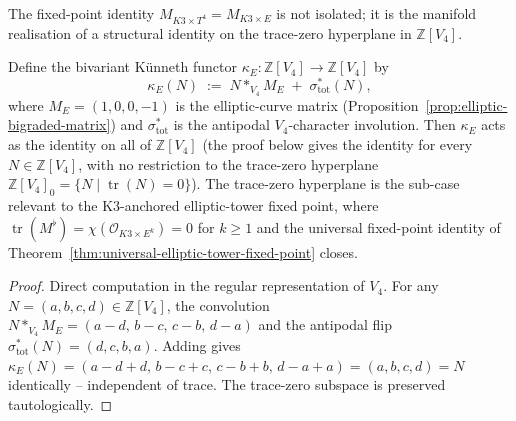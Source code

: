 The fixed-point identity $M_{K3 \times T^4} = M_{K3 \times E}$ is not
isolated; it is the manifold realisation of a structural identity on
the trace-zero hyperplane in $\mathbb{Z}[V_4]$.

\begin{lemma}
\label{lem:bivariant-kunneth-identity}
Define the bivariant Künneth functor
$\kappa_E: \mathbb{Z}[V_4] \to \mathbb{Z}[V_4]$ by
\[
 \kappa_E(N) \;:=\; N *_{V_4} M_E \;+\; \sigma_{\mathrm{tot}}^*(N),
\]
where $M_E = (1, 0, 0, -1)$ is the elliptic-curve matrix
\textup{(}Proposition~\ref{prop:elliptic-bigraded-matrix}\textup{)}
and $\sigma_{\mathrm{tot}}^*$ is the antipodal $V_4$-character involution.
Then $\kappa_E$ acts as the identity on all of $\mathbb{Z}[V_4]$
\textup{(}the proof below gives the identity for every $N \in \mathbb{Z}[V_4]$,
with no restriction to the trace-zero hyperplane
$\mathbb{Z}[V_4]_0 = \{N \mid \operatorname{tr}(N) = 0\}$\textup{).} The
trace-zero hyperplane is the sub-case relevant to the K$3$-anchored
elliptic-tower fixed point, where $\operatorname{tr}(M^\flat) =
\chi(\mathcal{O}_{K3 \times E^k}) = 0$ for $k \geq 1$ and the universal
fixed-point identity of
Theorem~\ref{thm:universal-elliptic-tower-fixed-point} closes.
\end{lemma}

\begin{proof}
Direct computation in the regular representation of $V_4$.
For any $N = (a, b, c, d) \in \mathbb{Z}[V_4]$, the convolution
$N *_{V_4} M_E = (a - d,\, b - c,\, c - b,\, d - a)$ and the antipodal
flip $\sigma_{\mathrm{tot}}^*(N) = (d, c, b, a)$. Adding gives
$\kappa_E(N) = (a - d + d,\, b - c + c,\, c - b + b,\, d - a + a)
= (a, b, c, d) = N$ identically -- independent of trace. The
trace-zero subspace is preserved tautologically.
\end{proof}


